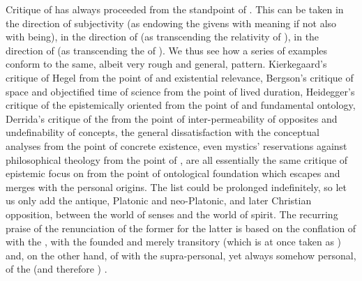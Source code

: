

%


\pa Critique of  has always proceeded from the standpoint of
. This can be taken in the direction of {subjectivity} (as
endowing the  givens with meaning if not also with being), in the
direction of  (as transcending the relativity of \herenow), in
the direction of  (as transcending the  of
).  We thus see how a series of examples conform to the same,
albeit very rough and general, pattern.  Kierkegaard's critique of Hegel from
the point of  and existential relevance, Bergson's
critique of space and objectified time of science from the point of lived
duration, Heidegger's critique of the epistemically oriented  from the point of  and fundamental ontology, Derrida's
critique of the  from the point of inter-permeability of opposites and
undefinability of concepts, the general dissatisfaction with the conceptual
analyses from the point of concrete existence, even mystics' reservations
against philosophical theology from the point of , are all
essentially the same critique of epistemic focus on  from the
point of ontological foundation which escapes  and merges with
the personal origins. The list could be prolonged indefinitely, so let us only
add the antique, Platonic and neo-Platonic, and later Christian opposition,
between the world of senses and the world of spirit. The recurring praise of the
renunciation of the former for the latter is based on the conflation of
 with the , with the founded and merely
transitory (which is at once taken as ) and, on the other hand, of
 with the supra-personal, yet always somehow personal,
 of the  (and therefore )
.

